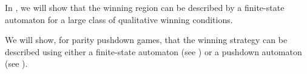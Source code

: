 In , we will show that the winning region can be described by a finite-state automaton  for a large class of qualitative winning conditions.



We will show, for parity pushdown games, that the winning strategy can be described using either a finite-state automaton (see ) or a pushdown automaton (see ).
